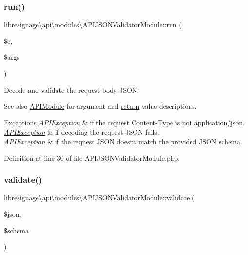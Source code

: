 \subsubsection{\texorpdfstring{run()}{run()}}
{\footnotesize\ttfamily libresignage\textbackslash{}api\textbackslash{}modules\textbackslash{}\+A\+P\+I\+J\+S\+O\+N\+Validator\+Module\+::run (\begin{DoxyParamCaption}\item[{\hyperlink{classlibresignage_1_1api_1_1APIEndpoint}{A\+P\+I\+Endpoint}}]{\$e,  }\item[{array}]{\$args }\end{DoxyParamCaption})}

Decode and validate the request body J\+S\+ON.

\begin{DoxySeeAlso}{See also}
\hyperlink{classlibresignage_1_1api_1_1APIModule}{A\+P\+I\+Module} for argument and \hyperlink{quota_200-default_8php_ae057f510746f2e7dcbd7d8ccfaf92a45}{return} value descriptions.
\end{DoxySeeAlso}

\begin{DoxyExceptions}{Exceptions}
{\em \hyperlink{classlibresignage_1_1api_1_1APIException}{A\+P\+I\+Exception}} & if the request Content-\/\+Type is not application/json. \\
\hline
{\em \hyperlink{classlibresignage_1_1api_1_1APIException}{A\+P\+I\+Exception}} & if decoding the request J\+S\+ON fails. \\
\hline
{\em \hyperlink{classlibresignage_1_1api_1_1APIException}{A\+P\+I\+Exception}} & if the request J\+S\+ON doesn\textquotesingle{}t match the provided J\+S\+ON schema. \\
\hline
\end{DoxyExceptions}


Definition at line 30 of file A\+P\+I\+J\+S\+O\+N\+Validator\+Module.\+php.

\mbox{\label{classlibresignage_1_1api_1_1modules_1_1APIJSONValidatorModule_a72e941a65c34a98c8767f515ef9f9157}} 
\subsubsection{\texorpdfstring{validate()}{validate()}}
{\footnotesize\ttfamily libresignage\textbackslash{}api\textbackslash{}modules\textbackslash{}\+A\+P\+I\+J\+S\+O\+N\+Validator\+Module\+::validate (\begin{DoxyParamCaption}\item[{string}]{\$json,  }\item[{}]{\$schema }\end{DoxyParamCaption})}

